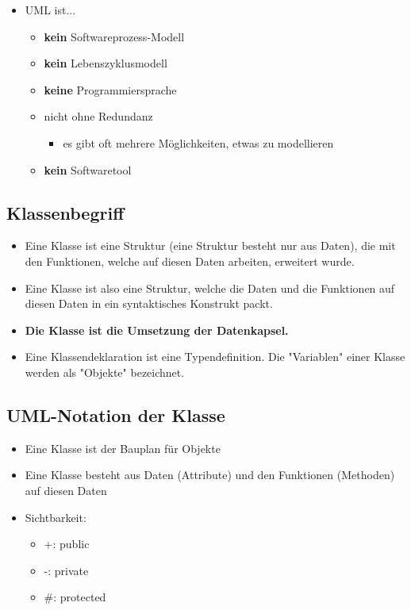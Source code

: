 \begin{itemize}
	\item UML ist...
	\begin{itemize}
		\item \textbf{kein} Softwareprozess-Modell
		\item \textbf{kein} Lebenszyklusmodell
		\item \textbf{keine} Programmiersprache
		\item nicht ohne Redundanz
		\begin{itemize}
			\item es gibt oft mehrere Möglichkeiten, etwas zu modellieren
		\end{itemize}
		\item \textbf{kein} Softwaretool
	\end{itemize}
\end{itemize}

\subsection{Klassenbegriff}
\label{sec:Klassenbegriff}
\begin{itemize}
	\item Eine Klasse ist eine Struktur (eine Struktur besteht nur aus Daten), die mit den Funktionen, welche auf diesen Daten arbeiten, erweitert wurde.
	\item Eine Klasse ist also eine Struktur, welche die Daten und die Funktionen auf diesen Daten in ein syntaktisches Konstrukt packt.
	\item \textbf{Die Klasse ist die Umsetzung der Datenkapsel.}
	\item Eine Klassendeklaration ist eine Typendefinition. Die "Variablen" einer Klasse werden als "Objekte" bezeichnet.
\end{itemize}

\subsection{UML-Notation der Klasse}
\begin{itemize}
	\item Eine Klasse ist der Bauplan für Objekte
	\item Eine Klasse besteht aus Daten (Attribute) und den Funktionen (Methoden) auf diesen Daten
	\item Sichtbarkeit:
	\begin{itemize}
		\item[\-] +: public
		\item[\-] -: private
		\item[\-] \#: protected
	\end{itemize}
\end{itemize}

